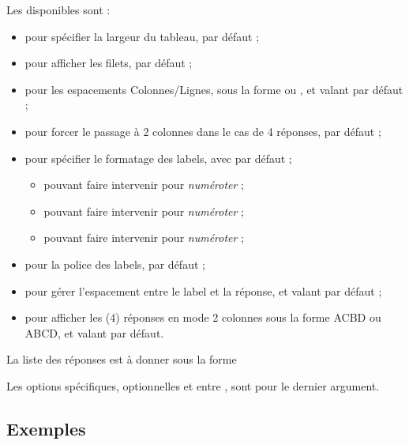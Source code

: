 \documentclass[french,11pt,a4paper]{article}
\begin{document}
Les  disponibles sont :

\begin{itemize}
	\item {} pour spécifier la largeur du tableau,  par défaut ;
	\item {} pour afficher les filets,  par défaut ;
	\item {} pour les espacements Colonnes/Lignes, sous la forme  ou , et valant \MontreCode{6pt/2pt} par défaut ;
	\item {} pour forcer le passage à 2 colonnes dans le cas de 4 réponses,  par défaut ;
	\item {} pour spécifier le formatage des labels, avec  par défaut ;
	\begin{itemize}
		\item pouvant faire intervenir  pour \textit{numéroter}  ;
		\item pouvant faire intervenir  pour \textit{numéroter}  ;
		\item pouvant faire intervenir  pour \textit{numéroter}  ;
	\end{itemize}
	\item {} pour la police des labels,  par défaut ;
	\item {} pour gérer l'espacement entre le label et la réponse, et valant  par défaut ;
	\item {} pour afficher les (4) réponses en mode 2 colonnes sous la forme ACBD ou ABCD, et valant  par défaut.
\end{itemize}

La liste des réponses est à donner sous la forme 

Les options spécifiques, optionnelles et entre , sont pour le dernier argument.

\subsection{Exemples}

\begin{DemoCode}{}
\end{DemoCode}
\end{document}
